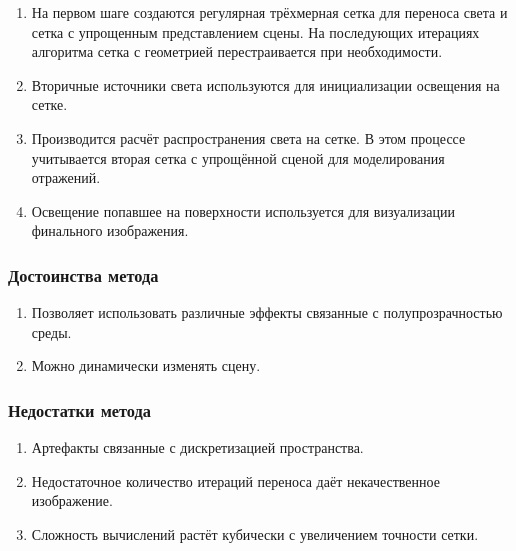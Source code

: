 \documentclass[12pt,fleqn]{article}
\begin{document}
\begin{enumerate}

\item На первом шаге создаются регулярная трёхмерная сетка для переноса света и сетка с упрощенным представлением сцены. На последующих итерациях алгоритма сетка с геометрией перестраивается при необходимости.

\item Вторичные источники света используются для инициализации освещения на сетке.

\item Производится расчёт распространения света на сетке. В этом процессе учитывается вторая сетка с упрощённой сценой для моделирования отражений.

\item Освещение попавшее на поверхности используется для визуализации финального изображения.

\end{enumerate}

\subsubsection{Достоинства метода}

\begin{enumerate}

\item Позволяет использовать различные эффекты связанные с полупрозрачностью среды.

\item Можно динамически изменять сцену.

\end{enumerate}

\subsubsection{Недостатки метода}

\begin{enumerate}

\item Артефакты связанные с дискретизацией пространства.

\item Недостаточное количество итераций переноса даёт некачественное изображение.

\item Сложность вычислений растёт кубически с увеличением точности сетки.

\end{enumerate}
\end{document}
